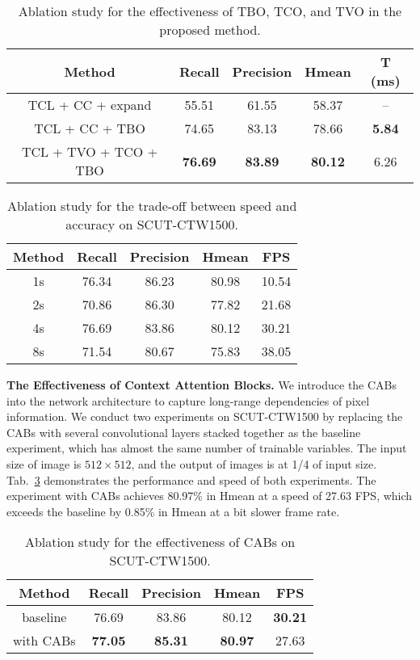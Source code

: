 \documentclass[sigconf]{acmart}
\begin{document}
\begin{table}
  \caption{Ablation study for the effectiveness of TBO, TCO, and TVO in the proposed method. }
  \label{tab:ab_main}
  \begin{tabular}{cc@{ }c@{ }c@{ }c}
    \toprule
    Method &Recall & Precision & Hmean & T (ms) \\
    \midrule
    TCL + CC + expand  &55.51	&61.55	&58.37	&--\\
    TCL + CC + TBO  &74.65	&83.13	&78.66	&\textbf{5.84} \\
    TCL + TVO + TCO + TBO  &\textbf{76.69}	&\textbf{83.89}	&\textbf{80.12}	&6.26\\
    \bottomrule
  \end{tabular}
\end{table}


\begin{table}

  \caption{Ablation study for the trade-off between speed and accuracy on SCUT-CTW1500. }
  \label{tab:ab_tradeoff}
  \begin{tabular}{ccccc}
    \toprule
     Method &Recall&Precision&Hmean & FPS\\
    \midrule
    1s &76.34 &86.23 &80.98  &10.54 \\
    2s &70.86 &86.30 &77.82  &21.68 \\
    4s &76.69 &83.86 &80.12  &30.21 \\
    8s &71.54 &80.67 &75.83  &38.05 \\
  \bottomrule
\end{tabular}
\end{table}



\textbf{The Effectiveness of Context Attention Blocks.} We introduce the CABs into the network architecture to capture long-range dependencies of pixel information. We conduct two experiments on SCUT-CTW1500 by replacing the CABs with several convolutional layers stacked together as the baseline experiment, which has almost the same number of trainable variables. The input size of image is $512 \times 512$, and the output of images is at 1/4 of input size. Tab.~\ref{tab:attention} demonstrates the performance and speed of both experiments. The experiment with CABs achieves 80.97\% in Hmean at a speed of 27.63 FPS, which exceeds the baseline by 0.85\% in Hmean at a bit slower frame rate.
\begin{table}
  \caption{ Ablation study for the effectiveness of CABs on SCUT-CTW1500.}
  \label{tab:attention}
  \begin{tabular}{ccccc}
    \toprule
      Method &Recall &Precision &Hmean &FPS\\
    \midrule
    baseline  &76.69	&83.86	&80.12 &\textbf{30.21} \\
    with CABs  &\textbf{77.05} 	&\textbf{85.31} 	&\textbf{80.97}  &27.63 \\
  \bottomrule
\end{tabular}
\end{table}
\end{document}
